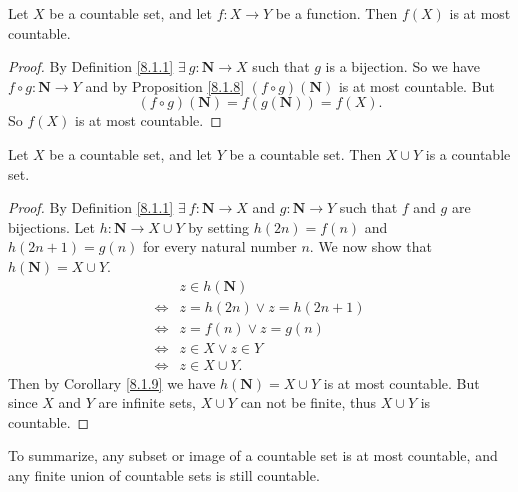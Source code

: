 \begin{corollary}\label{8.1.9}
Let \(X\) be a countable set, and let \(f : X \to Y\) be a function.
Then \(f(X)\) is at most countable.
\end{corollary}

\begin{proof}
By Definition \ref{8.1.1} \(\exists\ g : \mathbf{N} \to X\) such that \(g\) is a bijection.
So we have \(f \circ g : \mathbf{N} \to Y\) and by Proposition \ref{8.1.8} \((f \circ g)(\mathbf{N})\) is at most countable.
But
\[
    (f \circ g)(\mathbf{N}) = f(g(\mathbf{N})) = f(X).
\]
So \(f(X)\) is at most countable.
\end{proof}

\begin{proposition}\label{8.1.10}
Let \(X\) be a countable set, and let \(Y\) be a countable set.
Then \(X \cup Y\) is a countable set.
\end{proposition}

\begin{proof}
By Definition \ref{8.1.1} \(\exists\ f : \mathbf{N} \to X\) and \(g : \mathbf{N} \to Y\) such that \(f\) and \(g\) are bijections.
Let \(h : \mathbf{N} \to X \cup Y\) by setting \(h(2n) = f(n)\) and \(h(2n + 1) = g(n)\) for every natural number \(n\).
We now show that \(h(\mathbf{N}) = X \cup Y\).
\begin{align*}
& z \in h(\mathbf{N}) \\
\iff & z = h(2n) \lor z = h(2n + 1) \\
\iff & z = f(n) \lor z = g(n) \\
\iff & z \in X \lor z \in Y \\
\iff & z \in X \cup Y.
\end{align*}
Then by Corollary \ref{8.1.9} we have \(h(\mathbf{N}) = X \cup Y\) is at most countable.
But since \(X\) and \(Y\) are infinite sets, \(X \cup Y\) can not be finite, thus \(X \cup Y\) is countable.
\end{proof}

\begin{note}
To summarize, any subset or image of a countable set is at most countable, and any finite union of countable sets is still countable.
\end{note}